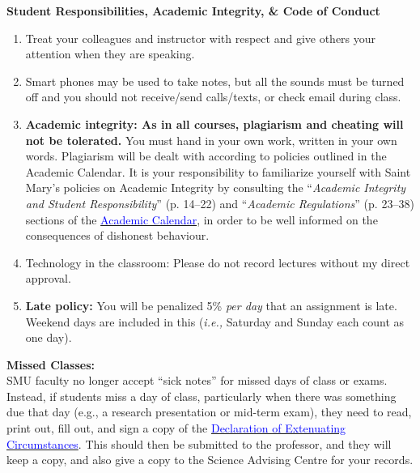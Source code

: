 \documentclass[hidelinks]{article}
\begin{document}
	\newpage
	\textbf{Student Responsibilities, Academic Integrity, \& Code of Conduct}
		\begin{enumerate}[topsep=-8pt]
			\item Treat your colleagues and instructor with respect and give others your attention when they are speaking.
			\item Smart phones may be used to take notes, but all the sounds must be turned off and you should not receive/send calls/texts, or check email during class.
			\item \textbf{Academic integrity: As in all courses, plagiarism and cheating will not be tolerated.} You must hand in your own work, written in your own words. Plagiarism will be dealt with according to policies outlined in the Academic Calendar. It is your responsibility to familiarize yourself with Saint Mary's policies on Academic Integrity by consulting the ``\emph{Academic Integrity and Student Responsibility}'' (p. 14--22) and ``\emph{Academic Regulations}'' (p. 23--38) sections of the \href{https://smu.ca/webfiles/AcademicCalendar2019-2020Undergraduate(PDF).pdf}{\textcolor{blue}{Academic Calendar}}, in order to be well informed on the consequences of dishonest behaviour.  
			\item Technology in the classroom: Please do not record lectures without my direct approval.
			\item \textbf{Late policy:} You will be penalized 5\% \emph{per day} that an assignment is late. Weekend days are included in this (\emph{i.e.,} Saturday and Sunday each count as one day).
		\end{enumerate}
		
	\vspace{0.3cm}
		
	\textbf{Missed Classes:}\\
	SMU faculty no longer accept ``sick notes'' for missed days of class or exams. Instead, if students miss a day of class, particularly when there was something due that day (e.g., a research presentation or mid-term exam), they need to read, print out, fill out, and sign a copy of the \href{http://www.smu.ca/webfiles/Declaration_of_Extenuating_Circumstances_withinTerm.pdf}{\textcolor{blue}{Declaration of Extenuating Circumstances}}. This should then be submitted to the professor, and they will keep a copy, and also give a copy to the Science Advising Centre for your records. 
	
\end{document}
